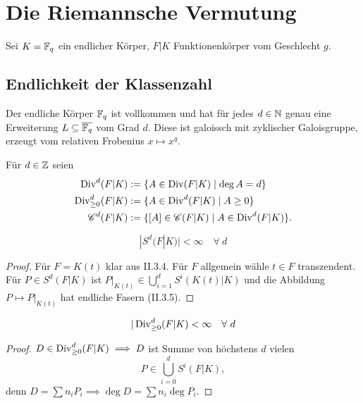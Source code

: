 
\chapter{Die Riemannsche Vermutung}
Sei $K =\mathbb{F}_q$ ein endlicher Körper, $F|K$ Funktionenkörper vom Geschlecht $g$.

\section{Endlichkeit der Klassenzahl}
\begin{erinnerungnr}
    Der endliche Körper $\mathbb{F}_q$ ist vollkommen und hat für jedes $d \in \mathbb{N}$ genau eine Erweiterung $L \subseteq \overline{\mathbb{F}_q}$ vom Grad $d$.
    Diese ist galoissch mit zyklischer Galoisgruppe, erzeugt vom relativen Frobenius $x \mapsto x^q$.
\end{erinnerungnr}

\begin{definition}
    Für $d \in \mathbb{Z}$ seien
    \begin{align*}
        \operatorname{Div}^d(F|K) &:= \{A \in \operatorname{Div}(F|K) \mid \deg A = d\} \\
        \operatorname{Div}^d_{\geq 0}(F|K) & := \{A \in \operatorname{Div}^d(F|K) \mid A \geq 0\}\\
        \mathscr{C}^d(F|K) & := \{[A] \in \mathscr{C}(F|K) \mid A \in \operatorname{Div}^d(F|K)\}.
    \end{align*}
\end{definition}

\begin{lemma}
    $$ |S^d(F|K)| < \infty \quad\forall~d$$
\end{lemma}
\begin{proof}
    Für $F = K(t)$ klar aus II.3.4. Für $F$ allgemein wähle $t \in F$ transzendent.
    Für $P \in S^d(F|K)$ ist $P|_{K(t)} \in \bigcup\limits_{i=1}^d S^i(K(t)|K)$ 
    und die Abbildung $P \mapsto P|_{K(t)}$ hat endliche Fasern (II.3.5).
\end{proof}

\begin{satz}
    $$ |\operatorname{Div}^d_{\geq 0} (F|K) < \infty \quad \forall~d$$
\end{satz}
\begin{proof}
    $D \in \operatorname{Div}^d_{\geq 0}(F|K) \implies D$ ist Summe von höchstens $d$ vielen
    $$ P \in \bigcup_{i=0}^d S^i(F|K), $$
    denn $D = \sum n_iP_i \implies \deg D = \sum n_i \deg P_i$. 
\end{proof}

